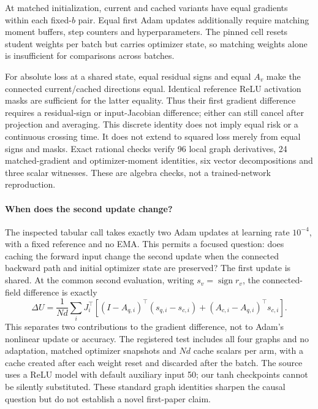 \documentclass[11pt,a4paper]{article}
\begin{document}
At matched initialization, current and cached variants have equal gradients
within each fixed-$b$ pair. Equal first Adam updates additionally require
matching moment buffers, step counters and hyperparameters. The pinned
cell resets student weights per batch but carries optimizer state, so
matching weights alone is insufficient for comparisons across batches.

For absolute loss at a shared state, equal residual signs and equal $A_v$
make the connected current/cached directions equal. Identical reference
ReLU activation masks are sufficient for the latter equality. Thus their
first gradient difference requires a residual-sign or input-Jacobian
difference; either can still cancel after projection and averaging.
This discrete identity does not imply equal risk or a continuous crossing
time. It does not extend to squared loss merely from equal signs and masks.
Exact rational checks verify 96 local graph derivatives, 24 matched-gradient
and optimizer-moment identities, six vector decompositions and three scalar
witnesses. These are algebra checks, not a trained-network reproduction.

\paragraph{When does the second update change?}
The inspected tabular call takes exactly two Adam updates at learning rate
$10^{-4}$, with a fixed reference and no EMA. This permits a focused question:
does caching the forward input change the second update when the connected
backward path and initial optimizer state are preserved? The first update
is shared. At the common second evaluation, writing $s_v=\operatorname{sign}r_v$,
the connected-field difference is exactly
\[
 \Delta U=\frac1{Nd}\sum_iJ_i^\top\left[
 (I-A_{q,i})^\top(s_{q,i}-s_{c,i})
 +(A_{c,i}-A_{q,i})^\top s_{c,i}\right].
\]
This separates two contributions to the gradient difference, not to Adam's
nonlinear update or accuracy. The registered test includes all four graphs
and no adaptation, matched optimizer snapshots and $Nd$ cache scalars per
arm, with a cache created after each weight reset and discarded after the
batch. The source uses a ReLU model with default auxiliary input 50;
our tanh checkpoints cannot be silently substituted. These standard graph
identities sharpen the causal question but do not establish a novel
first-paper claim.
\end{document}
